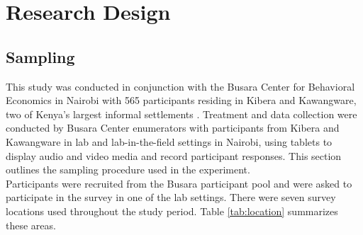 \documentclass[11pt, a4paper]{article}\usepackage[]{graphicx}\usepackage[]{color}
\begin{document}
\section{Research Design}

    \subsection{Sampling}

        This study was conducted in conjunction with the Busara Center for Behavioral Economics in Nairobi with 565 participants residing in Kibera and Kawangware, two of Kenya's largest informal settlements \parencite{haushofer_methodology_2014}. Treatment and data collection were conducted by Busara Center enumerators with participants from Kibera and Kawangware in lab and lab-in-the-field settings in Nairobi, using tablets to display audio and video media and record participant responses. This section outlines the sampling procedure used in the experiment. \\

        Participants were recruited from the Busara participant pool and were asked to participate in the survey in one of the lab settings. There were seven survey locations used throughout the study period. Table \ref{tab:location} summarizes these areas. 

        \begin{table}[h]
        \centering
        \caption{Survey location}
        \label{tab:location}
        \end{table}
\end{document}
